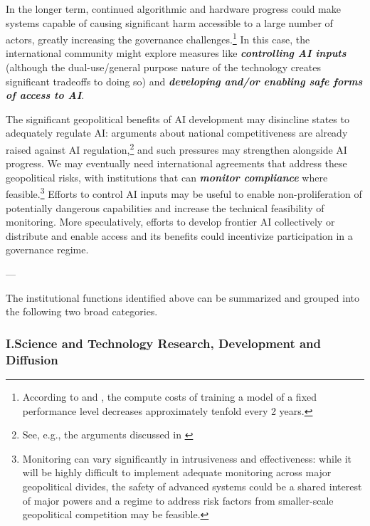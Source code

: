 \documentclass[12pt]{article}
\begin{document}
In the longer term, continued algorithmic and hardware progress could
make systems capable of causing significant harm accessible to a large
number of actors, greatly increasing the governance
challenges.\footnote{According to \cite{erdil_algorithmic_2023}
  and \cite{hobbhahn_trends_2022},
  the compute costs of training a model of a fixed performance level
  decreases approximately tenfold every 2 years.} In this case, the
international community might explore measures like
\emph{\textbf{controlling AI inputs}} (although the dual-use/general
purpose nature of the technology creates significant tradeoffs to doing
so) and \emph{\textbf{developing and/or enabling safe forms of access to
AI}}.

The significant geopolitical benefits of AI development may disincline
states to adequately regulate AI: arguments about national
competitiveness are already raised against AI regulation,\footnote{See, e.g., the arguments discussed in \cite{toner_illusion_2023}}
and such pressures may strengthen alongside AI progress. We may
eventually need international agreements that address these geopolitical
risks, with institutions that can \emph{\textbf{monitor compliance}}
where feasible.\footnote{Monitoring can vary significantly in
  intrusiveness and effectiveness: while it will be highly difficult to
  implement adequate monitoring across major geopolitical divides, the
  safety of advanced systems could be a shared interest of major powers
  and a regime to address risk factors from smaller-scale geopolitical
  competition may be feasible.} Efforts to control AI inputs may be
useful to enable non-proliferation of potentially dangerous capabilities
and increase the technical feasibility of monitoring. More
speculatively, efforts to develop frontier AI collectively or distribute
and enable access and its benefits could incentivize participation in a
governance regime.




\begin{center}
    ---
\end{center}




The institutional functions identified above can be summarized and
grouped into the following two broad categories.

\subsubsection*{I.\quad Science and Technology Research, Development and Diffusion}
\end{document}
